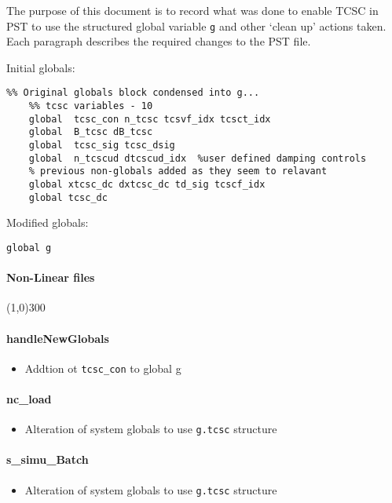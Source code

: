 \documentclass[12pt]{article}
\begin{document}
The purpose of this document is to record what was done to enable TCSC in PST to use the structured global variable \verb|g| and other `clean up' actions taken. \\
Each paragraph describes the required changes to the PST file.

Initial globals:
\begin{verbatim}
%% Original globals block condensed into g...
    %% tcsc variables - 10
    global  tcsc_con n_tcsc tcsvf_idx tcsct_idx
    global  B_tcsc dB_tcsc
    global  tcsc_sig tcsc_dsig
    global  n_tcscud dtcscud_idx  %user defined damping controls
	% previous non-globals added as they seem to relavant
	global xtcsc_dc dxtcsc_dc td_sig tcscf_idx 
    global tcsc_dc
\end{verbatim}

Modified globals:
\begin{verbatim}
global g
\end{verbatim}
\paragraph{Non-Linear files}\line(1,0){300}
\paragraph{handleNewGlobals}
	\begin{itemize}
		\item Addtion ot \verb|tcsc_con| to global g
	\end{itemize}

\paragraph{nc\_load}
	\begin{itemize}
		\item Alteration of system globals to use \verb|g.tcsc| structure
	\end{itemize}
	
\paragraph{s\_simu\_Batch}
	\begin{itemize}
		\item Alteration of system globals to use \verb|g.tcsc| structure
	\end{itemize}
	
\end{document}
